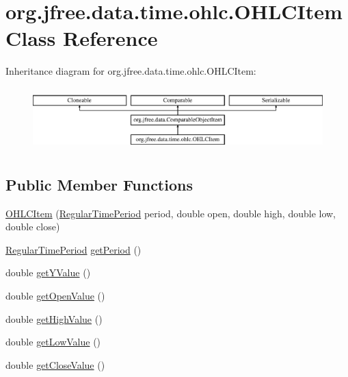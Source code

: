 \hypertarget{classorg_1_1jfree_1_1data_1_1time_1_1ohlc_1_1_o_h_l_c_item}{}\section{org.\+jfree.\+data.\+time.\+ohlc.\+O\+H\+L\+C\+Item Class Reference}
\label{classorg_1_1jfree_1_1data_1_1time_1_1ohlc_1_1_o_h_l_c_item}
Inheritance diagram for org.\+jfree.\+data.\+time.\+ohlc.\+O\+H\+L\+C\+Item\+:\begin{figure}[H]
\begin{center}
\leavevmode
\includegraphics[height=2.456140cm]{classorg_1_1jfree_1_1data_1_1time_1_1ohlc_1_1_o_h_l_c_item}
\end{center}
\end{figure}
\subsection*{Public Member Functions}
\begin{DoxyCompactItemize}
\item 
\mbox{\hyperlink{classorg_1_1jfree_1_1data_1_1time_1_1ohlc_1_1_o_h_l_c_item_a0c231e812a08d79e83ed50edb5189779}{O\+H\+L\+C\+Item}} (\mbox{\hyperlink{classorg_1_1jfree_1_1data_1_1time_1_1_regular_time_period}{Regular\+Time\+Period}} period, double open, double high, double low, double close)
\item 
\mbox{\hyperlink{classorg_1_1jfree_1_1data_1_1time_1_1_regular_time_period}{Regular\+Time\+Period}} \mbox{\hyperlink{classorg_1_1jfree_1_1data_1_1time_1_1ohlc_1_1_o_h_l_c_item_a07d1bd43e4f369a9b9983797f77b60b9}{get\+Period}} ()
\item 
double \mbox{\hyperlink{classorg_1_1jfree_1_1data_1_1time_1_1ohlc_1_1_o_h_l_c_item_abdc816c219bd9d79923f93ced894ddfa}{get\+Y\+Value}} ()
\item 
double \mbox{\hyperlink{classorg_1_1jfree_1_1data_1_1time_1_1ohlc_1_1_o_h_l_c_item_ad36fe1344143e4dab937f6eebf8d9d7b}{get\+Open\+Value}} ()
\item 
double \mbox{\hyperlink{classorg_1_1jfree_1_1data_1_1time_1_1ohlc_1_1_o_h_l_c_item_a056e11c87e8078460e67e289e301ff15}{get\+High\+Value}} ()
\item 
double \mbox{\hyperlink{classorg_1_1jfree_1_1data_1_1time_1_1ohlc_1_1_o_h_l_c_item_a65b2b9714146a3004a351e69b9ab332d}{get\+Low\+Value}} ()
\item 
double \mbox{\hyperlink{classorg_1_1jfree_1_1data_1_1time_1_1ohlc_1_1_o_h_l_c_item_a5d338bfc56e362ec81e1429461165206}{get\+Close\+Value}} ()
\end{DoxyCompactItemize}
